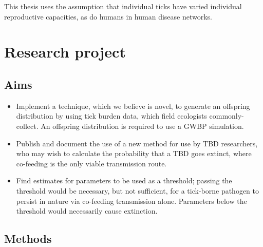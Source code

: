 \documentclass{article}
\begin{document}
This thesis uses the assumption that individual ticks have varied individual reproductive capacities, as do humans in human disease networks.  

\newpage

\section{Research project}

\subsection{Aims}

\begin{itemize}
  \item Implement a technique, which we believe is novel, to generate an offspring distribution by using tick burden data, which field ecologists commonly-collect. An offspring distribution is required to use a GWBP simulation.
  \item Publish and document the use of a new method for use by TBD researchers, who may wish to calculate the probability that a TBD goes extinct, where co-feeding is the only viable transmission route.
  \item Find estimates for parameters to be used as a threshold; passing the threshold would be necessary, but not sufficient, for a tick-borne pathogen to persist in nature via co-feeding transmission alone. Parameters below the threshold would necessarily cause extinction.
\end{itemize}

\subsection{Methods}
\end{document}
